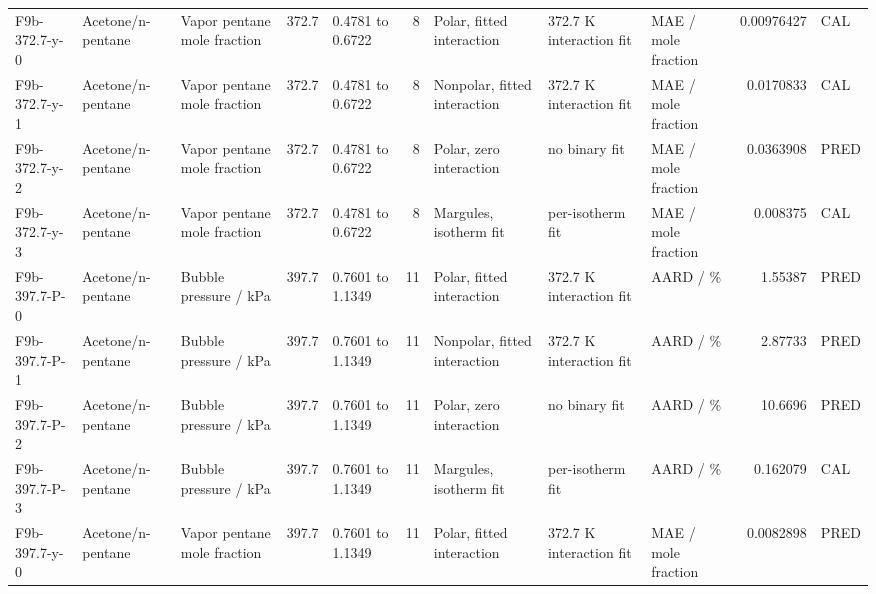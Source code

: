 \begin{landscape}
\begin{longtable}{L{1.9cm}L{2.5cm}L{2.1cm}L{1.6cm}L{1.6cm}rL{2.4cm}L{1.9cm}L{2.2cm}rL{1cm}}
F9b-\allowbreak{}372.7-\allowbreak{}y-\allowbreak{}0 & Acetone/\allowbreak{}n-\allowbreak{}pentane & Vapor pentane mole fraction & 372.7 & 0.4781 to 0.6722 & 8 & Polar, fitted interaction & 372.7 K interaction fit & MAE /\allowbreak{} mole fraction & 0.00976427 & CAL \\
F9b-\allowbreak{}372.7-\allowbreak{}y-\allowbreak{}1 & Acetone/\allowbreak{}n-\allowbreak{}pentane & Vapor pentane mole fraction & 372.7 & 0.4781 to 0.6722 & 8 & Nonpolar, fitted interaction & 372.7 K interaction fit & MAE /\allowbreak{} mole fraction & 0.0170833 & CAL \\
F9b-\allowbreak{}372.7-\allowbreak{}y-\allowbreak{}2 & Acetone/\allowbreak{}n-\allowbreak{}pentane & Vapor pentane mole fraction & 372.7 & 0.4781 to 0.6722 & 8 & Polar, zero interaction & no binary fit & MAE /\allowbreak{} mole fraction & 0.0363908 & PRED \\
F9b-\allowbreak{}372.7-\allowbreak{}y-\allowbreak{}3 & Acetone/\allowbreak{}n-\allowbreak{}pentane & Vapor pentane mole fraction & 372.7 & 0.4781 to 0.6722 & 8 & Margules, isotherm fit & per-\allowbreak{}isotherm fit & MAE /\allowbreak{} mole fraction & 0.008375 & CAL \\
F9b-\allowbreak{}397.7-\allowbreak{}P-\allowbreak{}0 & Acetone/\allowbreak{}n-\allowbreak{}pentane & Bubble pressure /\allowbreak{} kPa & 397.7 & 0.7601 to 1.1349 & 11 & Polar, fitted interaction & 372.7 K interaction fit & AARD /\allowbreak{} \% & 1.55387 & PRED \\
F9b-\allowbreak{}397.7-\allowbreak{}P-\allowbreak{}1 & Acetone/\allowbreak{}n-\allowbreak{}pentane & Bubble pressure /\allowbreak{} kPa & 397.7 & 0.7601 to 1.1349 & 11 & Nonpolar, fitted interaction & 372.7 K interaction fit & AARD /\allowbreak{} \% & 2.87733 & PRED \\
F9b-\allowbreak{}397.7-\allowbreak{}P-\allowbreak{}2 & Acetone/\allowbreak{}n-\allowbreak{}pentane & Bubble pressure /\allowbreak{} kPa & 397.7 & 0.7601 to 1.1349 & 11 & Polar, zero interaction & no binary fit & AARD /\allowbreak{} \% & 10.6696 & PRED \\
F9b-\allowbreak{}397.7-\allowbreak{}P-\allowbreak{}3 & Acetone/\allowbreak{}n-\allowbreak{}pentane & Bubble pressure /\allowbreak{} kPa & 397.7 & 0.7601 to 1.1349 & 11 & Margules, isotherm fit & per-\allowbreak{}isotherm fit & AARD /\allowbreak{} \% & 0.162079 & CAL \\
F9b-\allowbreak{}397.7-\allowbreak{}y-\allowbreak{}0 & Acetone/\allowbreak{}n-\allowbreak{}pentane & Vapor pentane mole fraction & 397.7 & 0.7601 to 1.1349 & 11 & Polar, fitted interaction & 372.7 K interaction fit & MAE /\allowbreak{} mole fraction & 0.0082898 & PRED \\

\end{longtable}
\end{landscape}

